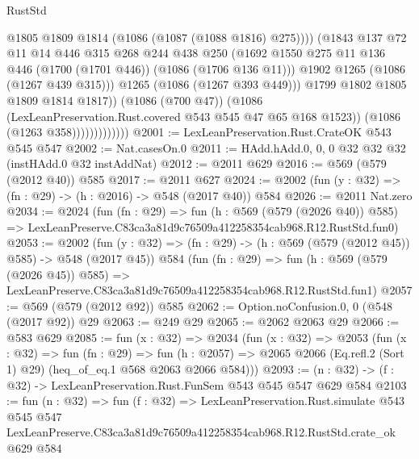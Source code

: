 \begin{lexlean}{RustStd}
\begin{coremodule}
                                    @1805
                                    @1809
                                    @1814
                                    (@1086 (@1087 (@1088 @1816) @275))))
                                (@1843
                                  @137
                                  @72
                                  @11
                                  @14
                                  @446
                                  @315
                                  @268
                                  @244
                                  @438
                                  @250
                                  (@1692
                                    @1550
                                    @275
                                    @11
                                    @136
                                    @446
                                    (@1700 (@1701 @446))
                                    (@1086 (@1706 @136 @11)))
                                  @1902
                                  @1265
                                  (@1086 (@1267 @439 @315)))
                                @1265
                                (@1086 (@1267 @393 @449)))
                              @1799
                              @1802
                              @1805
                              @1809
                              @1814
                              @1817))
                          (@1086 (@700 @47))
                          (@1086 (LexLeanPreservation.Rust.covered @543 @545 @47 @65 @168 @1523))
                          (@1086 (@1263 @358)))))))))))))
@2001 := LexLeanPreservation.Rust.CrateOK @543 @545 @547
@2002 := Nat.casesOn.{0}
@2011 := HAdd.hAdd.{0, 0, 0} @32 @32 @32 (instHAdd.{0} @32 instAddNat)
@2012 := @2011 @629
@2016 := @569 (@579 (@2012 @40)) @585
@2017 := @2011 @627
@2024 := @2002 (fun (y : @32) => (fn : @29) -> (h : @2016) -> @548 (@2017 @40)) @584
@2026 := @2011 Nat.zero
@2034 := @2024
    (fun (fn : @29) =>
    fun (h : @569 (@579 (@2026 @40)) @585) =>
    LexLeanPreserve.C83ca3a81d9c76509a412258354cab968.R12.RustStd.fun0)
@2053 := @2002
    (fun (y : @32) => (fn : @29) -> (h : @569 (@579 (@2012 @45)) @585) -> @548 (@2017 @45))
    @584
    (fun (fn : @29) =>
    fun (h : @569 (@579 (@2026 @45)) @585) =>
    LexLeanPreserve.C83ca3a81d9c76509a412258354cab968.R12.RustStd.fun1)
@2057 := @569 (@579 (@2012 @92)) @585
@2062 := Option.noConfusion.{0, 0} (@548 (@2017 @92)) @29
@2063 := @249 @29
@2065 := @2062 @2063 @29
@2066 := @583 @629
@2085 := fun (x : @32) =>
  @2034
    (fun (x : @32) =>
    @2053
      (fun (x : @32) =>
      fun (fn : @29) =>
      fun (h : @2057) =>
      @2065 @2066 (Eq.refl.{2} (Sort 1) @29) (heq_of_eq.{1} @568 @2063 @2066 @584)))
@2093 := (n : @32) -> (f : @32) -> LexLeanPreservation.Rust.FunSem @543 @545 @547 @629 @584
@2103 := fun (n : @32) =>
  fun (f : @32) =>
  LexLeanPreservation.Rust.simulate
    @543
    @545
    @547
    LexLeanPreserve.C83ca3a81d9c76509a412258354cab968.R12.RustStd.crate_ok
    @629
    @584
\end{coremodule}
\end{lexlean}
